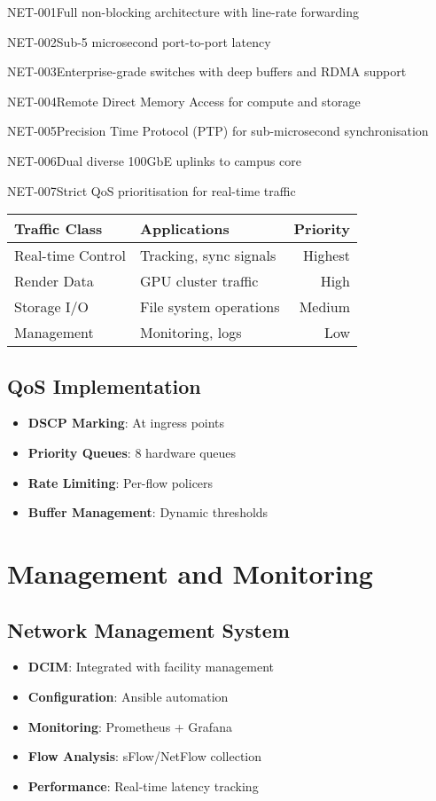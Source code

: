 \begin{requirement}{NET-001}{Full non-blocking architecture with line-rate forwarding}
\begin{requirement}{NET-002}{Sub-5 microsecond port-to-port latency}
\begin{requirement}{NET-003}{Enterprise-grade switches with deep buffers and RDMA support}
\begin{requirement}{NET-004}{Remote Direct Memory Access for compute and storage}
\begin{requirement}{NET-005}{Precision Time Protocol (PTP) for sub-microsecond synchronisation}
\begin{requirement}{NET-006}{Dual diverse 100GbE uplinks to campus core}
\begin{requirement}{NET-007}{Strict QoS prioritisation for real-time traffic}
\begin{table}[H]
\centering
\begin{tabularx}{\textwidth}{@{}lXr@{}}
\toprule
\textbf{Traffic Class} & \textbf{Applications} & \textbf{Priority} \\
\midrule
Real-time Control & Tracking, sync signals & Highest \\
Render Data & GPU cluster traffic & High \\
Storage I/O & File system operations & Medium \\
Management & Monitoring, logs & Low \\
\bottomrule
\end{tabularx}
\end{table}

\subsection{QoS Implementation}

\begin{itemize}
    \item \textbf{DSCP Marking}: At ingress points
    \item \textbf{Priority Queues}: 8 hardware queues
    \item \textbf{Rate Limiting}: Per-flow policers
    \item \textbf{Buffer Management}: Dynamic thresholds
\end{itemize}

\section{Management and Monitoring}

\subsection{Network Management System}

\begin{itemize}
    \item \textbf{DCIM}: Integrated with facility management
    \item \textbf{Configuration}: Ansible automation
    \item \textbf{Monitoring}: Prometheus + Grafana
    \item \textbf{Flow Analysis}: sFlow/NetFlow collection
    \item \textbf{Performance}: Real-time latency tracking
\end{itemize}


\end{requirement}
\end{requirement}
\end{requirement}
\end{requirement}
\end{requirement}
\end{requirement}
\end{requirement}
